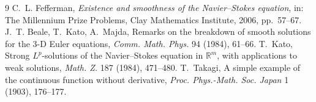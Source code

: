 \documentclass[11pt,a4paper]{article}
\theoremstyle{definition}
\theoremstyle{remark}
\begin{document}
\begin{thebibliography}{9}
 C.~L. Fefferman, \emph{Existence and smoothness of the Navier--Stokes equation}, in: The Millennium Prize Problems, Clay Mathematics Institute, 2006, pp.~57--67.
 J.~T. Beale, T.~Kato, A.~Majda, Remarks on the breakdown of smooth solutions for the 3-D Euler equations, \emph{Comm. Math. Phys.} 94 (1984), 61--66.
 T.~Kato, Strong $L^p$-solutions of the Navier--Stokes equation in $\mathbb{R}^m$, with applications to weak solutions, \emph{Math. Z.} 187 (1984), 471--480.
 T.~Takagi, A simple example of the continuous function without derivative, \emph{Proc. Phys.-Math. Soc. Japan} 1 (1903), 176--177.
\end{thebibliography}
\end{document}
